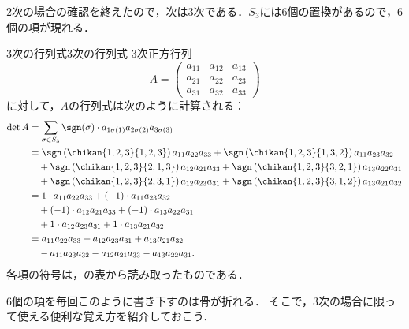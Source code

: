 $2$次の場合の確認を終えたので，次は$3$次である．$S_3$には$6$個の置換があるので，$6$個の項が現れる．

\begin{example}{3次の行列式}{3次の行列式}
  $3$次正方行列
  \[
    A = \begin{pmatrix} a_{11} & a_{12} & a_{13} \\ a_{21} & a_{22} & a_{23} \\ a_{31} & a_{32} & a_{33} \end{pmatrix}
  \]
  に対して，$A$の行列式は次のように計算される：
  \begin{align*}
    \det A
    &= \sum_{\sigma \in S_3}
       \sgn(\sigma) \cdot a_{1\sigma(1)} a_{2\sigma(2)} a_{3\sigma(3)} \\
    &= \sgn\left( \chikan{1, 2, 3}{1, 2, 3} \right)
       a_{11} a_{22} a_{33}
       + \sgn\left( \chikan{1, 2, 3}{1, 3, 2} \right)
       a_{11} a_{23} a_{32} \\
    &\quad + \sgn\left( \chikan{1, 2, 3}{2, 1, 3} \right)
       a_{12} a_{21} a_{33} 
       + \sgn\left( \chikan{1, 2, 3}{3, 2, 1} \right)
       a_{13} a_{22} a_{31} \\
    &\quad + \sgn\left( \chikan{1, 2, 3}{2, 3, 1} \right)
       a_{12} a_{23} a_{31} 
       + \sgn\left( \chikan{1, 2, 3}{3, 1, 2} \right)
       a_{13} a_{21} a_{32} \\
    &= 1 \cdot a_{11} a_{22} a_{33}
       + (-1) \cdot a_{11} a_{23} a_{32} \\
    &\quad + (-1) \cdot a_{12} a_{21} a_{33}
       + (-1) \cdot a_{13} a_{22} a_{31} \\
    &\quad + 1 \cdot a_{12} a_{23} a_{31}
       + 1 \cdot a_{13} a_{21} a_{32} \\
    &= a_{11} a_{22} a_{33}
       + a_{12} a_{23} a_{31}
       + a_{13} a_{21} a_{32} \\
    &\quad - a_{11} a_{23} a_{32}
       - a_{12} a_{21} a_{33}
       - a_{13} a_{22} a_{31}.
  \end{align*}
  各項の符号は，の表から読み取ったものである．
\end{example}

$6$個の項を毎回このように書き下すのは骨が折れる．
そこで，$3$次の場合に限って使える便利な覚え方を紹介しておこう．

